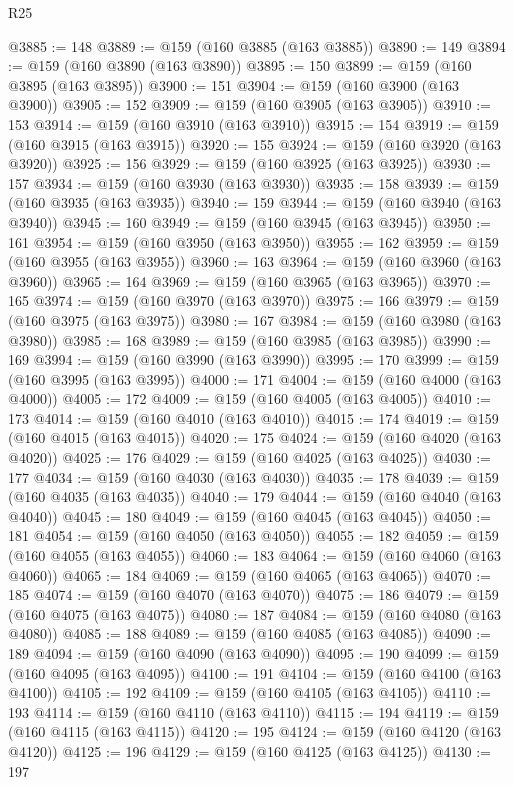\begin{lexlean}{R25}
\begin{coremodule}
{{{{{{{{{{{{{{{{{{{{{{{{{{{{{{{{{{{{{{{{{{{{{{{{{{{{{{{{{{{{{{{{{{{{{{{{{{{{{{{{{{{{{{{{{{{{{{{{{{{{{{{{{{{{{{{{{{{{{{{{{{{{{{{{{{{{{{{{{{{{{{{{{{{{{{{{{{{{{{{{{{{{{{{{{{{{{{{{{{{{{{{{{{{{{{{{{{{{{{{@3885 := 148
@3889 := @159 (@160 @3885 (@163 @3885))
@3890 := 149
@3894 := @159 (@160 @3890 (@163 @3890))
@3895 := 150
@3899 := @159 (@160 @3895 (@163 @3895))
@3900 := 151
@3904 := @159 (@160 @3900 (@163 @3900))
@3905 := 152
@3909 := @159 (@160 @3905 (@163 @3905))
@3910 := 153
@3914 := @159 (@160 @3910 (@163 @3910))
@3915 := 154
@3919 := @159 (@160 @3915 (@163 @3915))
@3920 := 155
@3924 := @159 (@160 @3920 (@163 @3920))
@3925 := 156
@3929 := @159 (@160 @3925 (@163 @3925))
@3930 := 157
@3934 := @159 (@160 @3930 (@163 @3930))
@3935 := 158
@3939 := @159 (@160 @3935 (@163 @3935))
@3940 := 159
@3944 := @159 (@160 @3940 (@163 @3940))
@3945 := 160
@3949 := @159 (@160 @3945 (@163 @3945))
@3950 := 161
@3954 := @159 (@160 @3950 (@163 @3950))
@3955 := 162
@3959 := @159 (@160 @3955 (@163 @3955))
@3960 := 163
@3964 := @159 (@160 @3960 (@163 @3960))
@3965 := 164
@3969 := @159 (@160 @3965 (@163 @3965))
@3970 := 165
@3974 := @159 (@160 @3970 (@163 @3970))
@3975 := 166
@3979 := @159 (@160 @3975 (@163 @3975))
@3980 := 167
@3984 := @159 (@160 @3980 (@163 @3980))
@3985 := 168
@3989 := @159 (@160 @3985 (@163 @3985))
@3990 := 169
@3994 := @159 (@160 @3990 (@163 @3990))
@3995 := 170
@3999 := @159 (@160 @3995 (@163 @3995))
@4000 := 171
@4004 := @159 (@160 @4000 (@163 @4000))
@4005 := 172
@4009 := @159 (@160 @4005 (@163 @4005))
@4010 := 173
@4014 := @159 (@160 @4010 (@163 @4010))
@4015 := 174
@4019 := @159 (@160 @4015 (@163 @4015))
@4020 := 175
@4024 := @159 (@160 @4020 (@163 @4020))
@4025 := 176
@4029 := @159 (@160 @4025 (@163 @4025))
@4030 := 177
@4034 := @159 (@160 @4030 (@163 @4030))
@4035 := 178
@4039 := @159 (@160 @4035 (@163 @4035))
@4040 := 179
@4044 := @159 (@160 @4040 (@163 @4040))
@4045 := 180
@4049 := @159 (@160 @4045 (@163 @4045))
@4050 := 181
@4054 := @159 (@160 @4050 (@163 @4050))
@4055 := 182
@4059 := @159 (@160 @4055 (@163 @4055))
@4060 := 183
@4064 := @159 (@160 @4060 (@163 @4060))
@4065 := 184
@4069 := @159 (@160 @4065 (@163 @4065))
@4070 := 185
@4074 := @159 (@160 @4070 (@163 @4070))
@4075 := 186
@4079 := @159 (@160 @4075 (@163 @4075))
@4080 := 187
@4084 := @159 (@160 @4080 (@163 @4080))
@4085 := 188
@4089 := @159 (@160 @4085 (@163 @4085))
@4090 := 189
@4094 := @159 (@160 @4090 (@163 @4090))
@4095 := 190
@4099 := @159 (@160 @4095 (@163 @4095))
@4100 := 191
@4104 := @159 (@160 @4100 (@163 @4100))
@4105 := 192
@4109 := @159 (@160 @4105 (@163 @4105))
@4110 := 193
@4114 := @159 (@160 @4110 (@163 @4110))
@4115 := 194
@4119 := @159 (@160 @4115 (@163 @4115))
@4120 := 195
@4124 := @159 (@160 @4120 (@163 @4120))
@4125 := 196
@4129 := @159 (@160 @4125 (@163 @4125))
@4130 := 197
}}}}}}}}}}}}}}}}}}}}}}}}}}}}}}}}}}}}}}}}}}}}}}}}}}}}}}}}}}}}}}}}}}}}}}}}}}}}}}}}}}}}}}}}}}}}}}}}}}}}}}}}}}}}}}}}}}}}}}}}}}}}}}}}}}}}}}}}}}}}}}}}}}}}}}}}}}}}}}}}}}}}}}}}}}}}}}}}}}}}}}}}}}}}}}}}}}}}}}}
\end{coremodule}
\end{lexlean}
